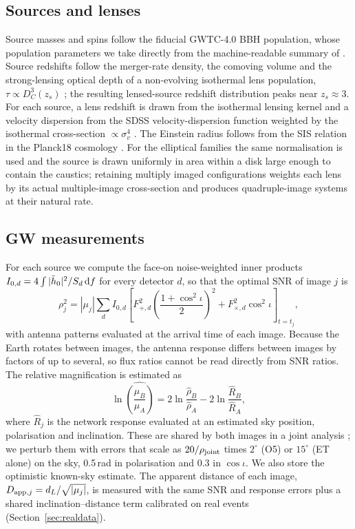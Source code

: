 \subsection{Sources and lenses}
Source masses and spins follow the fiducial GWTC-4.0 BBH population, whose population parameters we take directly from the machine-readable summary of \citet{lvk2025gwtc4pop}. Source redshifts follow the merger-rate density, the comoving volume and the strong-lensing optical depth of a non-evolving isothermal lens population, $\tau\propto D_C^3(z_s)$ \citep{turner1984statistics}; the resulting lensed-source redshift distribution peaks near $z_s\approx3$. For each source, a lens redshift is drawn from the isothermal lensing kernel and a velocity dispersion from the SDSS velocity-dispersion function weighted by the isothermal cross-section $\propto\sigma_v^4$ \citep{choi2007vdf,haris2018identifying}. The Einstein radius follows from the SIS relation in the Planck18 cosmology \citep{planck2020cosmology}. For the elliptical families the same normalisation is used and the source is drawn uniformly in area within a disk large enough to contain the caustics; retaining multiply imaged configurations weights each lens by its actual multiple-image cross-section and produces quadruple-image systems at their natural rate.

\subsection{GW measurements}
\label{sec:gwmeas}
For each source we compute the face-on noise-weighted inner products $I_{0,d}=4\int|\tilde h_0|^2/S_d\,{\rm d}f$ for every detector $d$, so that the optimal SNR of image $j$ is
\begin{equation}
\rho_j^2=|\mu_j|\sum_d I_{0,d}\left[F_{+,d}^2\left(\frac{1+\cos^2\iota}{2}\right)^2+F_{\times,d}^2\cos^2\iota\right]_{t=t_j},
\end{equation}
with antenna patterns evaluated at the arrival time of each image. Because the Earth rotates between images, the antenna response differs between images by factors of up to several, so flux ratios cannot be read directly from SNR ratios. The relative magnification is estimated as
\begin{equation}
\ln\widehat{\left(\frac{\mu_B}{\mu_A}\right)}=2\ln\frac{\hat\rho_B}{\hat\rho_A}-2\ln\frac{\hat R_B}{\hat R_A},
\end{equation}
where $\hat R_j$ is the network response evaluated at an estimated sky position, polarisation and inclination. These are shared by both images in a joint analysis \citep{janquart2023golum,lo2023bayesian}; we perturb them with errors that scale as $20/\rho_{\rm joint}$ times $2^\circ$ (O5) or $15^\circ$ (ET alone) on the sky, 0.5\,rad in polarisation and 0.3 in $\cos\iota$. We also store the optimistic known-sky estimate. The apparent distance of each image, $D_{{\rm app},j}=d_L/\sqrt{|\mu_j|}$, is measured with the same SNR and response errors plus a shared inclination--distance term calibrated on real events (Section~\ref{sec:realdata}).

